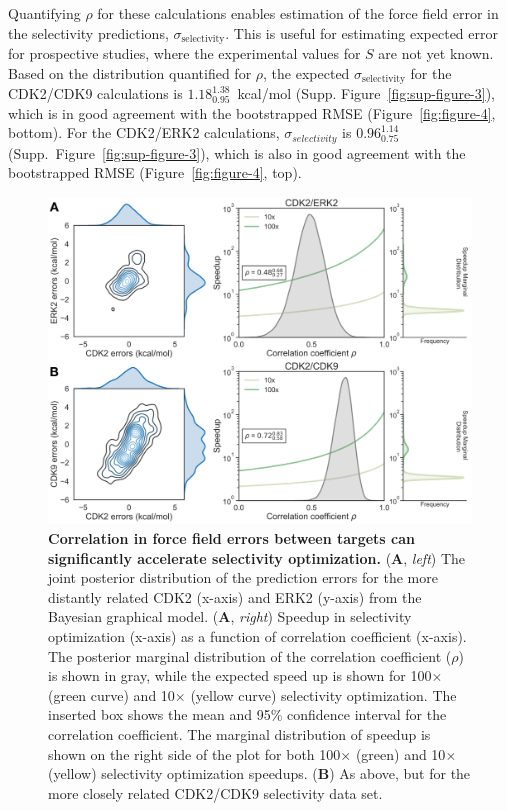 \documentclass[phd,tocprelim]{cornell}
\begin{document}
Quantifying $\rho$ for these calculations enables estimation of the force field error in the selectivity predictions, $\sigma_\text{selectivity}$. 
This is useful for estimating expected error for prospective studies, where the experimental values for $S$ are not yet known. Based on the distribution quantified for $\rho$, the expected $\sigma_\text{selectivity}$ for the CDK2/CDK9 calculations is $1.18^{1.38}_{0.95}$~kcal/mol (Supp. Figure~\ref{fig:sup-figure-3}), which is in good agreement with the bootstrapped RMSE (Figure~\ref{fig:figure-4}, bottom). 
For the CDK2/ERK2 calculations, $\sigma_{selectivity}$ is $0.96^{1.14}_{0.75}$ (Supp.\ Figure~\ref{fig:sup-figure-3}), which is also in good agreement with the bootstrapped RMSE (Figure~\ref{fig:figure-4}, top). 

\begin{landscape}
\begin{figure}
\centering
\includegraphics[width=0.7\linewidth]{figures/figure5.pdf}
\caption[Correlation in force field errors between targets can significantly accelerate selectivity optimization.]{
{\bf Correlation in force field errors between targets can significantly accelerate selectivity optimization.} 
({\bf A}, \emph{left}) The joint posterior distribution of the prediction errors for the more distantly related CDK2 (x-axis) and ERK2 (y-axis) from the Bayesian graphical model. 
({\bf A}, \emph{right}) Speedup in selectivity optimization (x-axis) as a function of correlation coefficient (x-axis). 
The posterior marginal distribution of the correlation coefficient ($\rho$) is shown in gray, while the expected speed up is shown for 100$\times$ (green curve) and 10$\times$ (yellow curve) selectivity optimization. 
The inserted box shows the mean and 95\% confidence interval for the correlation coefficient. The marginal distribution of speedup is shown on the right side of the plot for both 100$\times$ (green) and 10$\times$ (yellow) selectivity optimization speedups. 
({\bf B}) As above, but for the more closely related CDK2/CDK9 selectivity data set.
}
\label{fig:figure-5}
\end{figure}
\end{landscape}
\end{document}
